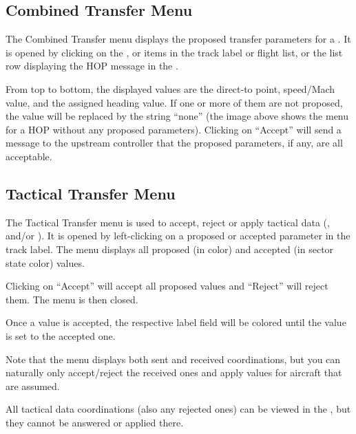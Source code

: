 \documentclass[a4paper,oneside,11pt]{memoir}
\begin{document}
\subsection{Combined Transfer Menu}
\label{menu:ctm}

The Combined Transfer menu displays the proposed transfer parameters for a . It is opened by clicking on the ,  or  items in the track label or flight list, or the list row displaying the HOP message in the .

\bigskip

From top to bottom, the displayed values are the direct-to point, speed/Mach value, and the assigned heading value. If one or more of them are not proposed, the value will be replaced by the string “none” (the image above shows the menu for a HOP without any proposed parameters). Clicking on “Accept” will send a message to the upstream controller that the proposed parameters, if any, are all acceptable.

\subsection{Tactical Transfer Menu}
\label{menu:ttm}

The Tactical Transfer menu is used to accept, reject or apply tactical data (,  and/or ). It is opened by left-clicking on a proposed or accepted parameter in the track label. The menu displays all proposed (in  color) and accepted (in sector state color) values.

\bigskip

Clicking on “Accept” will accept all proposed values and “Reject” will reject them. The menu is then closed.

\bigskip

Once a value is accepted, the respective label field will be colored  until the value is set to the accepted one.
\bigskip

Note that the menu displays both sent and received coordinations, but you can naturally only accept/reject the received ones and apply values for aircraft that are assumed.

\bigskip

All tactical data coordinations (also any rejected ones) can be viewed in the , but they cannot be answered or applied there.
\end{document}
